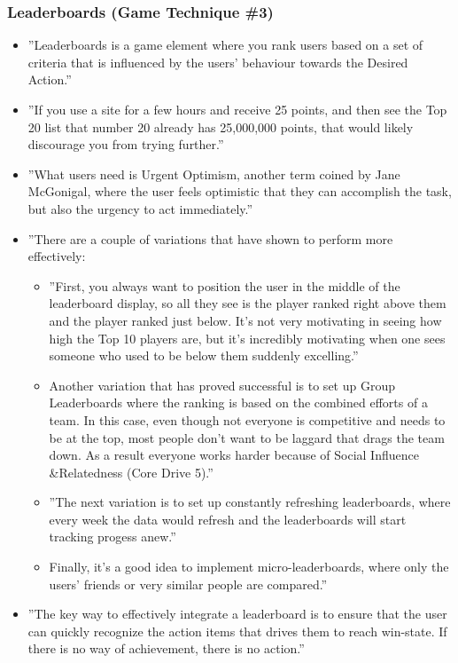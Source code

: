 \subsubsection{Leaderboards (Game Technique \#3)}
\begin{itemize}
    \item ''Leaderboards is a game element where you rank users based on a set of criteria that is influenced by the users' behaviour towards the Desired Action.''
    \item ''If you use a site for a few hours and receive 25 points, and then see the Top 20 list that number 20 already has 25,000,000 points, that would likely discourage you from trying further.''
    \item ''What users need is Urgent Optimism, another term coined by Jane McGonigal, where the user feels optimistic that they can accomplish the task, but also the urgency to act immediately.''
    \item ''There are a couple of variations that have shown to perform more effectively:
    \begin{itemize}
        \item ''First, you always want to position the user in the middle of the leaderboard display, so all they see is the player ranked right above them and the player ranked just below. It's not very motivating in seeing how high the Top 10 players are, but it's incredibly motivating when one sees someone who used to be below them suddenly excelling.''
        \item Another variation that has proved successful is to set up Group Leaderboards where the ranking is based on the combined efforts of a team. In this case, even though not everyone is competitive and needs to be at the top, most people don't want to be laggard that drags the team down. As a result everyone works harder because of Social Influence \&Relatedness (Core Drive 5).''
        \item ''The next variation is to set up constantly refreshing leaderboards, where every week the data would refresh and the leaderboards will start tracking progess anew.''
        \item Finally, it's a good idea to implement micro-leaderboards, where only the users' friends or very similar people are compared.''
    \end{itemize}
    \item ''The key way to effectively integrate a leaderboard is to ensure that the user can quickly recognize the action items that drives them to reach win-state. If there is no way of achievement, there is no action.''
\end{itemize}

